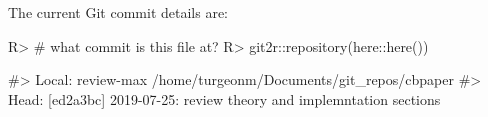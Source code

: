 \documentclass[
]{jss}
\begin{document}
The current Git commit details are:

\begin{CodeChunk}

\begin{CodeInput}
R> # what commit is this file at? 
R> git2r::repository(here::here())
\end{CodeInput}

\begin{CodeOutput}
#> Local:    review-max /home/turgeonm/Documents/git_repos/cbpaper
#> Head:     [ed2a3bc] 2019-07-25: review theory and implemntation sections
\end{CodeOutput}
\end{CodeChunk}


\end{document}
